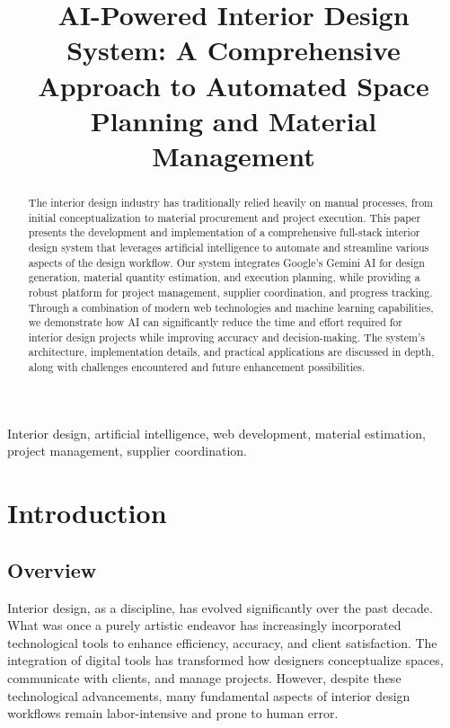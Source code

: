 \documentclass[conference]{IEEEtran}
\title{AI-Powered Interior Design System: A Comprehensive Approach to Automated Space Planning and Material Management}
\author{\IEEEauthorblockN{Author Name}
\IEEEauthorblockA{\textit{Department of Computer Science} \\
\textit{University Name} \\
City, Country \\
email@example.com}
}
\begin{document}
\maketitle

\begin{abstract}
The interior design industry has traditionally relied heavily on manual processes, from initial conceptualization to material procurement and project execution. This paper presents the development and implementation of a comprehensive full-stack interior design system that leverages artificial intelligence to automate and streamline various aspects of the design workflow. Our system integrates Google's Gemini AI for design generation, material quantity estimation, and execution planning, while providing a robust platform for project management, supplier coordination, and progress tracking. Through a combination of modern web technologies and machine learning capabilities, we demonstrate how AI can significantly reduce the time and effort required for interior design projects while improving accuracy and decision-making. The system's architecture, implementation details, and practical applications are discussed in depth, along with challenges encountered and future enhancement possibilities.
\end{abstract}

\begin{IEEEkeywords}
Interior design, artificial intelligence, web development, material estimation, project management, supplier coordination.
\end{IEEEkeywords}

\section{Introduction}

\subsection{Overview}
Interior design, as a discipline, has evolved significantly over the past decade. What was once a purely artistic endeavor has increasingly incorporated technological tools to enhance efficiency, accuracy, and client satisfaction. The integration of digital tools has transformed how designers conceptualize spaces, communicate with clients, and manage projects. However, despite these technological advancements, many fundamental aspects of interior design workflows remain labor-intensive and prone to human error.
\end{document}
